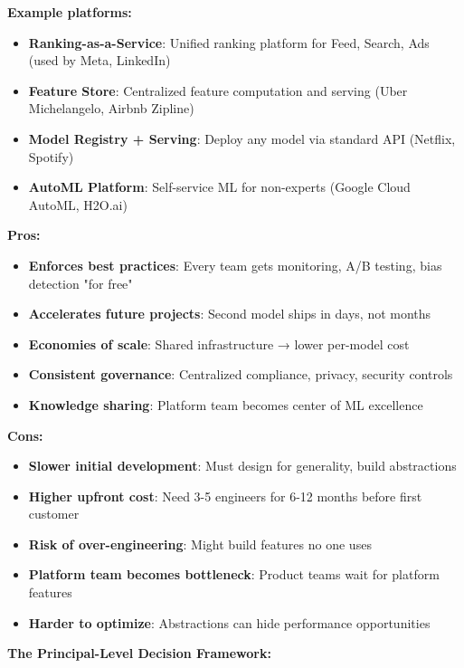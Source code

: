 \documentclass[10pt]{article}
\begin{document}
\textbf{Example platforms:}
\begin{itemize}
\item \textbf{Ranking-as-a-Service}: Unified ranking platform for Feed, Search, Ads (used by Meta, LinkedIn)
\item \textbf{Feature Store}: Centralized feature computation and serving (Uber Michelangelo, Airbnb Zipline)
\item \textbf{Model Registry + Serving}: Deploy any model via standard API (Netflix, Spotify)
\item \textbf{AutoML Platform}: Self-service ML for non-experts (Google Cloud AutoML, H2O.ai)
\end{itemize}

\textbf{Pros:}
\begin{itemize}
\item \textbf{Enforces best practices}: Every team gets monitoring, A/B testing, bias detection "for free"
\item \textbf{Accelerates future projects}: Second model ships in days, not months
\item \textbf{Economies of scale}: Shared infrastructure → lower per-model cost
\item \textbf{Consistent governance}: Centralized compliance, privacy, security controls
\item \textbf{Knowledge sharing}: Platform team becomes center of ML excellence
\end{itemize}

\textbf{Cons:}
\begin{itemize}
\item \textbf{Slower initial development}: Must design for generality, build abstractions
\item \textbf{Higher upfront cost}: Need 3-5 engineers for 6-12 months before first customer
\item \textbf{Risk of over-engineering}: Might build features no one uses
\item \textbf{Platform team becomes bottleneck}: Product teams wait for platform features
\item \textbf{Harder to optimize}: Abstractions can hide performance opportunities
\end{itemize}

\textbf{The Principal-Level Decision Framework:}
\end{document}
